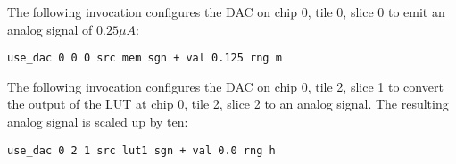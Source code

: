 The following invocation configures the DAC on chip 0, tile 0, slice 0 to emit
an analog signal of $0.25 \mu A$:

\begin{lstlisting}
use_dac 0 0 0 src mem sgn + val 0.125 rng m
\end{lstlisting}



The following invocation configures the DAC on chip 0, tile 2, slice 1 to
convert the output of the LUT at chip 0, tile 2, slice 2 to an analog signal.
The resulting analog signal is scaled up by ten:

\begin{lstlisting}
use_dac 0 2 1 src lut1 sgn + val 0.0 rng h
\end{lstlisting}